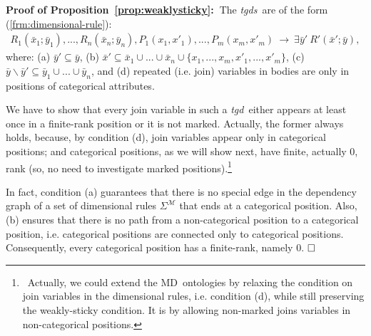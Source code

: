 \documentclass[format=acmsmall, review=false, screen=true]{acmart}
\newcommand{\dproof}[2]{{\noindent\bf Proof of #1:~}#2}
\newcommand{\boxtheorem}{\ensuremath{\hfill \Box}}
\newcommand{\mc}[1]{\mathcal{ #1}}
\newcommand{\md}{MD}
\newcommand{\tgds}{{\em tgds}}
\newcommand{\tgd}{{\em tgd}}
\newcommand{\red}[1]{{#1}}
\begin{document}
\dproof{Proposition~\ref{prop:weaklysticky}}{\red{The \tgds \ are of the form (\ref{frm:dimensional-rule}):}
\red{\begin{align*}
R_1(\bar{x}_1;\bar{y}_1),...,R_n(\bar{x}_n;\bar{y}_n),P_1(x_1,x'_1),...,P_m(x_m,x'_m) \ \rightarrow \ \exists \bar{y}' \ R'(\bar{x}';\bar{y}),
 \end{align*}}where: (a) $\bar{y}' \subseteq \bar{y}$, (b) $\bar{x}' \subseteq \bar{x}_1 \cup ... \cup \bar{x}_n \cup \{x_1,...,x_m, x'_1,...,x'_m\}$, (c) $\bar{y} \! \smallsetminus \! \bar{y}' \subseteq \bar{y}_1 \cup ... \cup \bar{y}_n$, and (d) repeated (i.e. join) variables in bodies are only in positions of categorical attributes.

We have to show that every join variable in such a \tgd \ either appears at least once in a finite-rank position or it is not marked. Actually,  the former always holds, because, by condition (d), join variables appear only in categorical positions; and categorical positions,  as we will show next, have finite, actually $0$, rank (so, no need to investigate marked positions).\footnote{\ Actually, we could extend the \md \ ontologies by relaxing the condition on join variables in the dimensional rules, i.e. condition (d), while still preserving the weakly-sticky condition. It is by allowing non-marked joins variables in non-categorical positions.}




In fact, condition (a) guarantees that there is no special edge in the dependency graph of a set of dimensional rules $\Sigma^\mc{M}$ that ends at a categorical position. Also, (b) ensures that there is no path from a non-categorical position to a categorical position, i.e. categorical positions are connected only to categorical positions. Consequently, every categorical position has a finite-rank, namely $0$. \boxtheorem}\\
\end{document}
